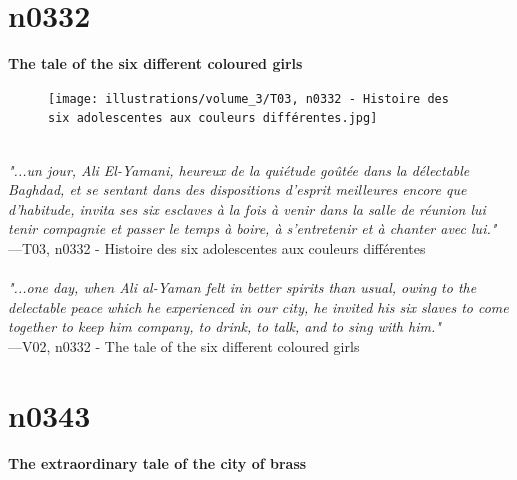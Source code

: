 \documentclass[../Carre_nights.tex]{subfiles}
\begin{document}
\newpage

\section{n0332}
\textbf{\Large{The tale of the six different coloured girls}} \\

\begin{figure}[ht]
\centering
\texttt{[image: illustrations/volume\_3/T03, n0332 - Histoire des six adolescentes aux couleurs différentes.jpg]}
\end{figure}

\textit{\\
"...un jour, Ali El-Yamani, heureux de la quiétude goûtée dans la délectable Baghdad, et se sentant dans des dispositions d’esprit meilleures encore que d’habitude, invita ses six esclaves à la fois à venir dans la salle de réunion lui tenir compagnie et passer le temps à boire, à s’entretenir et à chanter avec lui."} \\
—T03, n0332 - Histoire des six adolescentes aux couleurs différentes \\~\\
\textit{"...one day, when Ali al-Yaman felt in better spirits than usual, owing to the delectable peace which he experienced in our city, he invited his six slaves to come together to keep him company, to drink, to talk, and to sing with him."} \\
—V02, n0332 - The tale of the six different coloured girls

\newpage

\section{n0343}
\textbf{\Large{The extraordinary tale of the city of brass}} \\
\end{document}
